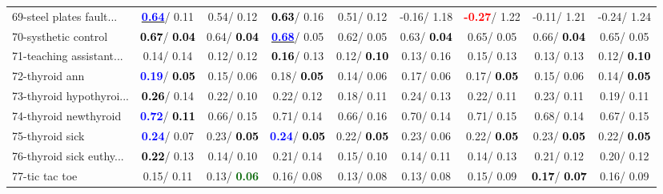 \begin{table}[h]
\begin{center}
\begin{tabular}{lc|c|c|c|c|c|c|c}
69-steel plates fault... & \underline{\textcolor{blue}{\textbf{  0.64}}}/  0.11 &   0.54/  0.12 & \textcolor{black}{\textbf{  0.63}}/  0.16 &   0.51/  0.12 &  -0.16/  1.18 & \textcolor{red}{\textbf{ -0.27}}/  1.22 &  -0.11/  1.21 &  -0.24/  1.24 \\
70-systhetic control & \textcolor{black}{\textbf{  0.67}}/\textcolor{black}{\textbf{  0.04}} &   0.64/\textcolor{black}{\textbf{  0.04}} & \underline{\textcolor{blue}{\textbf{  0.68}}}/  0.05 &   0.62/  0.05 &   0.63/\textcolor{black}{\textbf{  0.04}} &   0.65/  0.05 &   0.66/\textcolor{black}{\textbf{  0.04}} &   0.65/  0.05 \\
71-teaching assistant... &   0.14/  0.14 &   0.12/  0.12 & \textcolor{black}{\textbf{  0.16}}/  0.13 &   0.12/\textcolor{black}{\textbf{  0.10}} &   0.13/  0.16 &   0.15/  0.13 &   0.13/  0.13 &   0.12/\textcolor{black}{\textbf{  0.10}} \\ \hline
72-thyroid ann & \textcolor{blue}{\textbf{  0.19}}/\textcolor{black}{\textbf{  0.05}} &   0.15/  0.06 &   0.18/\textcolor{black}{\textbf{  0.05}} &   0.14/  0.06 &   0.17/  0.06 &   0.17/\textcolor{black}{\textbf{  0.05}} &   0.15/  0.06 &   0.14/\textcolor{black}{\textbf{  0.05}} \\
73-thyroid hypothyroi... & \textcolor{black}{\textbf{  0.26}}/  0.14 &   0.22/  0.10 &   0.22/  0.12 &   0.18/  0.11 &   0.24/  0.13 &   0.22/  0.11 &   0.23/  0.11 &   0.19/  0.11 \\
74-thyroid newthyroid & \textcolor{blue}{\textbf{  0.72}}/\textcolor{black}{\textbf{  0.11}} &   0.66/  0.15 &   0.71/  0.14 &   0.66/  0.16 &   0.70/  0.14 &   0.71/  0.15 &   0.68/  0.14 &   0.67/  0.15 \\
75-thyroid sick & \textcolor{blue}{\textbf{  0.24}}/  0.07 &   0.23/\textcolor{black}{\textbf{  0.05}} & \textcolor{blue}{\textbf{  0.24}}/\textcolor{black}{\textbf{  0.05}} &   0.22/\textcolor{black}{\textbf{  0.05}} &   0.23/  0.06 &   0.22/\textcolor{black}{\textbf{  0.05}} &   0.23/\textcolor{black}{\textbf{  0.05}} &   0.22/\textcolor{black}{\textbf{  0.05}} \\
76-thyroid sick euthy... & \textcolor{black}{\textbf{  0.22}}/  0.13 &   0.14/  0.10 &   0.21/  0.14 &   0.15/  0.10 &   0.14/  0.11 &   0.14/  0.13 &   0.21/  0.12 &   0.20/  0.12 \\
77-tic tac toe &   0.15/  0.11 &   0.13/\textcolor{darkgreen}{\textbf{  0.06}} &   0.16/  0.08 &   0.13/  0.08 &   0.13/  0.08 &   0.15/  0.09 & \textcolor{black}{\textbf{  0.17}}/\textcolor{black}{\textbf{  0.07}} &   0.16/  0.09 \\

\end{tabular}
\end{center}
\end{table}
